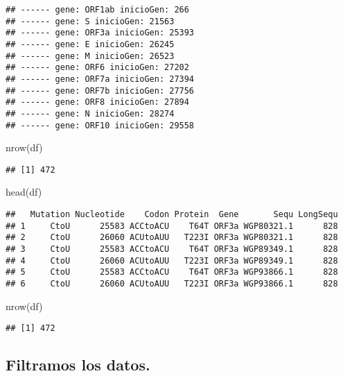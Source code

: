 \documentclass[
]{article}
\newenvironment{Shaded}{\begin{snugshade}}{\end{snugshade}}
\newcommand{\FunctionTok}[1]{\textcolor[rgb]{0.00,0.00,0.00}{#1}}
\newcommand{\NormalTok}[1]{#1}
\begin{document}
\begin{verbatim}
## ------ gene: ORF1ab inicioGen: 266 
## ------ gene: S inicioGen: 21563 
## ------ gene: ORF3a inicioGen: 25393 
## ------ gene: E inicioGen: 26245 
## ------ gene: M inicioGen: 26523 
## ------ gene: ORF6 inicioGen: 27202 
## ------ gene: ORF7a inicioGen: 27394 
## ------ gene: ORF7b inicioGen: 27756 
## ------ gene: ORF8 inicioGen: 27894 
## ------ gene: N inicioGen: 28274 
## ------ gene: ORF10 inicioGen: 29558
\end{verbatim}

\begin{Shaded}
\begin{Highlighting}[]
\FunctionTok{nrow}\NormalTok{(df)}
\end{Highlighting}
\end{Shaded}

\begin{verbatim}
## [1] 472
\end{verbatim}

\begin{Shaded}
\begin{Highlighting}[]
\FunctionTok{head}\NormalTok{(df)}
\end{Highlighting}
\end{Shaded}

\begin{verbatim}
##   Mutation Nucleotide    Codon Protein  Gene       Sequ LongSequ
## 1     CtoU      25583 ACCtoACU    T64T ORF3a WGP80321.1      828
## 2     CtoU      26060 ACUtoAUU   T223I ORF3a WGP80321.1      828
## 3     CtoU      25583 ACCtoACU    T64T ORF3a WGP89349.1      828
## 4     CtoU      26060 ACUtoAUU   T223I ORF3a WGP89349.1      828
## 5     CtoU      25583 ACCtoACU    T64T ORF3a WGP93866.1      828
## 6     CtoU      26060 ACUtoAUU   T223I ORF3a WGP93866.1      828
\end{verbatim}

\begin{Shaded}
\begin{Highlighting}[]
\FunctionTok{nrow}\NormalTok{(df)}
\end{Highlighting}
\end{Shaded}

\begin{verbatim}
## [1] 472
\end{verbatim}

\hypertarget{filtramos-los-datos.-1}{%
\subsection{Filtramos los datos.}\label{filtramos-los-datos.-1}}
\end{document}
